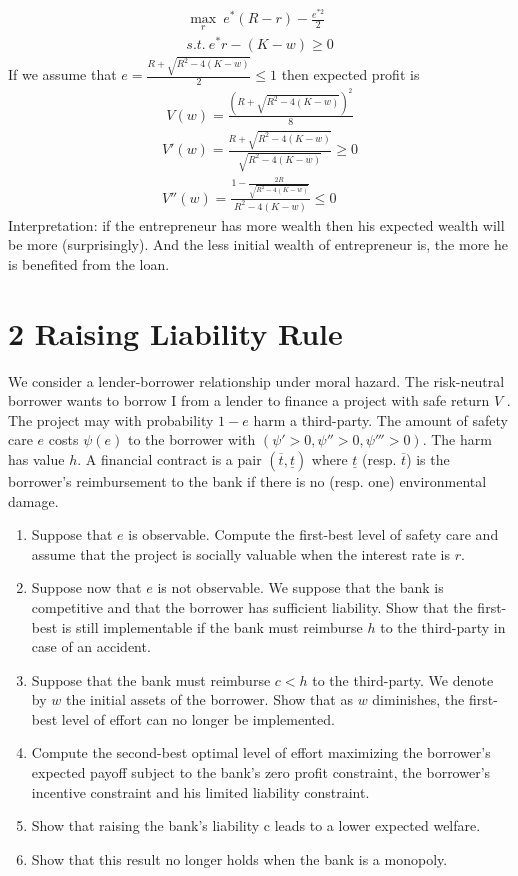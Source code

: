 \documentclass[a4paper]{article}
\newcommand{\ubar}{\overline}
\newcommand{\lbar}{\underline}
\begin{document}
\begin{enumerate}
	\begin{align*}
	\underset{r}{\max}\ e^*(R - r) - \frac{e^{*2}}{2}\\
	s.t.\ e^*r - (K - w) \ge 0
	\end{align*}
	If we assume that $e = \frac{R + \sqrt{R^2 - 4(K - w)}}{2} \le 1$ then expected profit is
	\begin{align*}
	V(w) = \frac{\left(R + \sqrt{R^2 - 4(K - w)}\right)^2}{8}
	\end{align*}
	\begin{align*}
	V'(w) = \frac{R + \sqrt{R^2 - 4(K - w)}}{\sqrt{R^2 - 4(K - w)}} \ge 0\\
	V''(w) = \frac{1 - \frac{2R}{\sqrt{R^2 - 4(K - w)}}}{R^2 - 4(K - w)} \le 0
	\end{align*}
	Interpretation: if the entrepreneur has more wealth then his expected wealth will be more (surprisingly). And the less initial wealth of entrepreneur is, the more he is benefited from the loan.
\end{enumerate}


\section*{2 Raising Liability Rule}
	We consider a lender-borrower relationship under moral hazard. The risk-neutral borrower wants to borrow I from a lender to finance a project with safe return $V$ . The project may with probability $1-e$ harm a third-party. The amount of safety care $e$ costs $\psi(e)$ to the borrower with $(\psi' > 0, \psi'' > 0, \psi''' > 0)$. The harm has value $h$. A financial contract is a pair $(\ubar{t}, \lbar{t})$ where $\lbar{t}$ (resp. $\ubar{t}$) is the borrower's reimbursement to the bank if	there is no (resp. one) environmental damage.
	
	\begin{enumerate}
		\item Suppose that $e$ is observable. Compute the first-best level of safety care and assume
		that the project is socially valuable when the interest rate is $r$.
		\item Suppose now that $e$ is not observable. We suppose that the bank is competitive
		and that the borrower has sufficient liability. Show that the first-best is still implementable if the bank must reimburse $h$ to the third-party in case of an accident.
		\item Suppose that the bank must reimburse $c < h$ to the third-party. We denote by $w$
		the initial assets of the borrower. Show that as $w$ diminishes, the first-best level of
		effort can no longer be implemented.
		\item Compute the second-best optimal level of effort maximizing the borrower's expected payoff subject to the bank's zero profit constraint, the borrower's incentive
		constraint and his limited liability constraint.
		\item Show that raising the bank's liability c leads to a lower expected welfare.
		\item Show that this result no longer holds when the bank is a monopoly.
	\end{enumerate}
\end{document}
